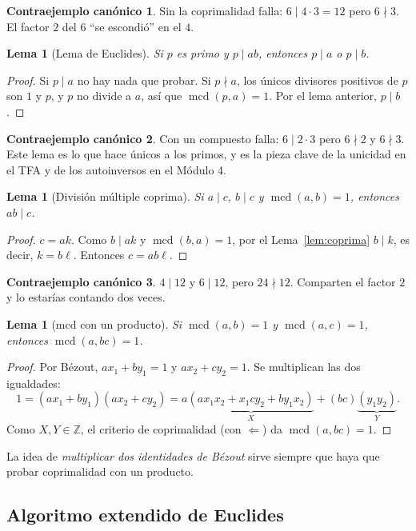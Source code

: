 \documentclass[11pt,a4paper]{article}
\newtheorem{lema}[teorema]{Lema}
\theoremstyle{definition}
\newcommand{\Z}{\mathbb{Z}}
\newcommand{\mcd}{\operatorname{mcd}}
\theoremstyle{notait}
\theoremstyle{nota}
\newtheorem*{contra}{Contraejemplo canónico}
\begin{document}
\begin{contra}
Sin la coprimalidad falla: $6\mid 4\cdot 3=12$ pero $6\nmid 3$. El factor $2$ del $6$ ``se escondió'' en el $4$.
\end{contra}

\begin{lema}[Lema de Euclides]
Si $p$ es primo y $p\mid ab$, entonces $p\mid a$ o $p\mid b$.
\end{lema}
\begin{proof}
Si $p\mid a$ no hay nada que probar. Si $p\nmid a$, los únicos divisores positivos de $p$ son $1$ y $p$, y $p$ no divide a $a$, así que $\mcd(p,a)=1$. Por el lema anterior, $p\mid b$.
\end{proof}

\begin{contra}
Con un compuesto falla: $6\mid 2\cdot 3$ pero $6\nmid2$ y $6\nmid3$. Este lema es lo que hace únicos a los primos, y es la pieza clave de la unicidad en el TFA y de los autoinversos en el Módulo 4.
\end{contra}

\begin{lema}[División múltiple coprima]
Si $a\mid c$, $b\mid c$ y $\mcd(a,b)=1$, entonces $ab\mid c$.
\end{lema}
\begin{proof}
$c=ak$. Como $b\mid ak$ y $\mcd(b,a)=1$, por el Lema~\ref{lem:coprima} $b\mid k$, es decir, $k=b\ell$. Entonces $c=ab\ell$.
\end{proof}
\begin{contra}
$4\mid 12$ y $6\mid 12$, pero $24\nmid 12$. Comparten el factor $2$ y lo estarías contando dos veces.
\end{contra}

\begin{lema}[mcd con un producto]
Si $\mcd(a,b)=1$ y $\mcd(a,c)=1$, entonces $\mcd(a,bc)=1$.
\end{lema}
\begin{proof}
Por Bézout, $ax_1+by_1=1$ y $ax_2+cy_2=1$. Se multiplican las dos igualdades:
\[
1=(ax_1+by_1)(ax_2+cy_2)=a\underbrace{(ax_1x_2+x_1cy_2+by_1x_2)}_{X}+(bc)\underbrace{(y_1y_2)}_{Y}.
\]
Como $X,Y\in\Z$, el criterio de coprimalidad (con $\Leftarrow$) da $\mcd(a,bc)=1$.
\end{proof}
La idea de \emph{multiplicar dos identidades de Bézout} sirve siempre que haya que probar coprimalidad con un producto.

\subsection{Algoritmo extendido de Euclides}
\end{document}

